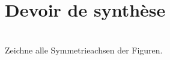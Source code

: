 


\pagestyle{empty}
\section*{Devoir de synthèse}

\\
Zeichne alle Symmetrieachsen der Figuren.\\
[Contenu exercices...]
